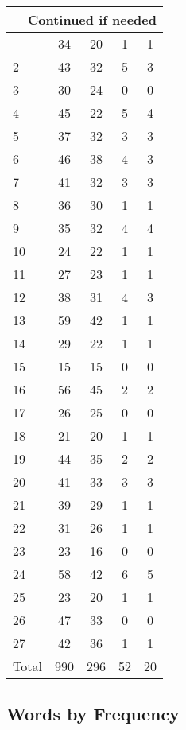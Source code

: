 \begin{center}
\begin{longtable}{l|c|c|c|c}
\hline \multicolumn{5}{|r|}{{Continued if needed}} \\ \hline
\endfoot 
1 & 34 & 20 & 1 & 1\\ \hline
2 & 43 & 32 & 5 & 3\\ \hline
3 & 30 & 24 & 0 & 0\\ \hline
4 & 45 & 22 & 5 & 4\\ \hline
5 & 37 & 32 & 3 & 3\\ \hline
6 & 46 & 38 & 4 & 3\\ \hline
7 & 41 & 32 & 3 & 3\\ \hline
8 & 36 & 30 & 1 & 1\\ \hline
9 & 35 & 32 & 4 & 4\\ \hline
10 & 24 & 22 & 1 & 1\\ \hline
11 & 27 & 23 & 1 & 1\\ \hline
12 & 38 & 31 & 4 & 3\\ \hline
13 & 59 & 42 & 1 & 1\\ \hline
14 & 29 & 22 & 1 & 1\\ \hline
15 & 15 & 15 & 0 & 0\\ \hline
16 & 56 & 45 & 2 & 2\\ \hline
17 & 26 & 25 & 0 & 0\\ \hline
18 & 21 & 20 & 1 & 1\\ \hline
19 & 44 & 35 & 2 & 2\\ \hline
20 & 41 & 33 & 3 & 3\\ \hline
21 & 39 & 29 & 1 & 1\\ \hline
22 & 31 & 26 & 1 & 1\\ \hline
23 & 23 & 16 & 0 & 0\\ \hline
24 & 58 & 42 & 6 & 5\\ \hline
25 & 23 & 20 & 1 & 1\\ \hline
26 & 47 & 33 & 0 & 0\\ \hline
27 & 42 & 36 & 1 & 1\\ \hline
\hline \hline
Total & 990 & 296 & 52 & 20



\end{longtable}
\end{center}

 
\subsection{Words by Frequency}


